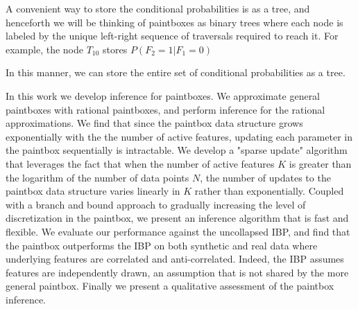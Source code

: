 \documentclass{article}
\begin{document}
A convenient way to store the conditional probabilities is as a tree, and henceforth we will be thinking of paintboxes as binary trees where each node is labeled by the unique left-right sequence of traversals required to reach it.  For example, the node $T_{10}$ stores $P(F_2=1|F_1=0)$ 

In this manner, we can store the entire set of conditional probabilities as a tree.    

In this work we develop inference for paintboxes.  We approximate general paintboxes with rational paintboxes, and perform inference for the rational approximations.  We find that since the paintbox data structure grows exponentially with the the number of active features, updating each parameter in the paintbox sequentially is intractable.  We develop a "sparse update" algorithm that leverages the fact that when the number of active features $K$ is greater than the logarithm of the number of data points $N$, the number of updates to the paintbox data structure varies linearly in $K$ rather than exponentially.  Coupled with a branch and bound approach to gradually increasing the level of discretization in the paintbox, we present an inference algorithm that is fast and flexible.  We evaluate our performance against the uncollapsed IBP, and find that the paintbox outperforms the IBP on both synthetic and real data where underlying features are correlated and anti-correlated.  Indeed, the IBP assumes features are independently drawn, an assumption that is not shared by the more general paintbox.  Finally we present a qualitative assessment of the paintbox inference.            
\end{document}
